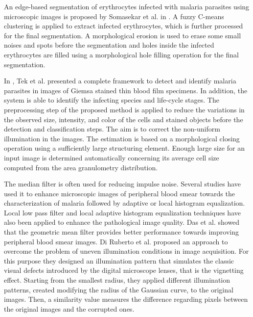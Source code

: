 \documentclass[final,a4paper,12pt,english]{UnicaPhdThesis3}
\begin{document}
An edge-based segmentation of erythrocytes infected with malaria parasites using microscopic images is proposed by Somasekar et al. in \cite{Somasekar2015}.  A fuzzy C-means clustering is applied to extract infected erythrocytes, which is further processed for the final segmentation. A morphological erosion is used to erase some small noises and spots before the segmentation and holes inside the infected erythrocytes are filled using a morphological hole filling operation for the final segmentation.

In \cite{Tek2010}, Tek et al. presented a complete framework to detect and identify malaria parasites in images of Giemsa stained thin blood film specimens. In addition, the system is able to identify the infecting species and life-cycle stages.
The preprocessing step of the proposed method is applied to reduce the variations in the observed size, intensity, and color of the cells and stained objects before the detection and classification steps. The aim is to correct the non-uniform illumination in the images. The estimation is based on a morphological closing operation using a sufficiently large structuring element. Enough large size for an input image is determined automatically concerning its average cell size computed from the area granulometry distribution.

The median filter is often used for reducing impulse noise. Several studies have used it to enhance microscopic images of peripheral blood smear towards the characterization of malaria followed by adaptive or local histogram equalization. Local low pass filter and local adaptive histogram equalization techniques have also been applied to enhance the pathological image quality. Das et al. \cite{Das2015} showed that the geometric mean filter provides better performance towards improving peripheral blood smear images. Di Ruberto et al. \cite{DiRuberto2016} proposed an approach to overcome the problem of uneven illumination conditions in image acquisition. For this purpose they designed an illumination pattern that simulates the classic visual defects introduced by the digital microscope lenses, that is the vignetting effect. Starting from the smallest radius, they applied different illumination patterns, created modifying the radius of the Gaussian curve, to the original images. Then, a similarity value measures the difference regarding pixels between the original images and the corrupted ones.
\end{document}
